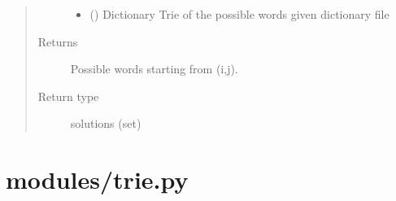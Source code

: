 \documentclass[letterpaper,10pt,english]{sphinxmanual}
\begin{document}
\begin{fulllineitems}
\begin{fulllineitems}
\begin{quote}
\begin{description}
\begin{itemize}
\item {} 
 () \textendash{} Dictionary Trie of the possible words given dictionary file

\end{itemize}

\item[{Returns}] \leavevmode
Possible words starting from (i,j).

\item[{Return type}] \leavevmode
solutions (set)

\end{description}\end{quote}

\end{fulllineitems}


\end{fulllineitems}



\section{modules/trie.py}
\label{\detokenize{index:modules-trie-py}}
\end{document}
